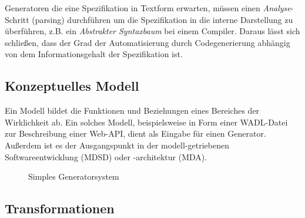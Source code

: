 Generatoren die eine Spezifikation in Textform erwarten, müssen einen \emph{Analyse}-Schritt (parsing) durchführen um die Spezifikation in die interne Darstellung zu überführen, z.B. ein \emph{Abstrakter Syntaxbaum} bei einem Compiler. Daraus lässt sich schließen, dass der Grad der Automatisierung durch Codegenerierung abhängig von dem Informationsgehalt der Spezifikation ist.

\subsection{Konzeptuelles Modell}

Ein Modell bildet die Funktionen und Beziehungen eines Bereiches der Wirklichkeit ab.
Ein solches Modell, beispielsweise in Form einer \gls{WADL}-Datei zur Beschreibung einer Web-API, dient als Eingabe für einen Generator. Außerdem ist es der Ausgangspunkt in der modell-getriebenen Softwareentwicklung (\gls{MDSD}) oder -architektur (\gls{MDA}).

\begin{figure}[tb]
    \begin{center}
    \end{center}
    \caption{Simples Generatorsystem}
    \label{fig:generatorsystem}
\end{figure}


\subsection{Transformationen}

